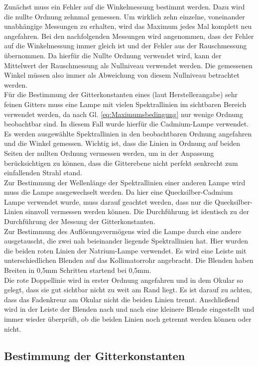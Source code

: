 \documentclass[12pt,a4paper]{article}
\begin{document}
Zunächst muss ein Fehler auf die Winkelmessung bestimmt werden. Dazu wird die nullte Ordnung zehnmal gemessen. Um wirklich zehn einzelne, voneinander unabhängige Messungen zu erhalten, wird das Maximum jedes Mal komplett neu angefahren. Bei den nachfolgenden Messungen wird angenommen, dass der Fehler auf die Winkelmessung immer gleich ist und der Fehler aus der Rauschmessung übernommen. Da hierfür die Nullte Ordnung verwendet wird, kann der Mittelwert der Rauschmessung als Nullniveau verwendet werden. Die gemessenen Winkel müssen also immer als Abweichung von diesem Nullniveau betrachtet werden.\\
Für die Bestimmung der Gitterkonstanten eines (laut Herstellerangabe) sehr feinen Gitters muss eine Lampe mit vielen Spektrallinien im sichtbaren Bereich verwendet werden, da nach Gl. \ref{eq:Maximumsbedingung} nur wenige Ordnung beobachtbar sind. In diesem Fall wurde hierfür die Cadmium-Lampe verwendet. Es werden ausgewählte Spektrallinien in den beobachtbaren Ordnung angefahren und die Winkel gemessen. Wichtig ist, dass die Linien in Ordnung auf beiden Seiten der nullten Ordnung vermessen werden, um in der Anpassung berücksichtigen zu können, dass die Gitterebene nicht perfekt senkrecht zum einfallenden Strahl stand.\\
Zur Bestimmung der Wellenlänge der Spektrallinien einer anderen Lampe wird muss die Lampe ausgewechselt werden. Da hier eine Quecksilber-Cadmium Lampe verwendet wurde, muss darauf geachtet werden, dass nur die Quecksilber-Linien sinnvoll vermessen werden können. Die Durchführung ist identisch zu der Durchführung der Messung der Gitterkonstanten.\\
Zur Bestimmung des Auflösungsvermögens wird die Lampe durch eine andere ausgetauscht, die zwei nah beieinander liegende Spektrallinien hat. Hier wurden die beiden roten Linien der Natrium-Lampe verwendet. Es wird eine Leiste mit unterschiedlichen Blenden auf das Kollimatorrohr angebracht. Die Blenden haben Breiten in 0,5mm Schritten startend bei 0,5mm.\\
Die rote Doppellinie wird in erster Ordnung angefahren und in dem Okular so gelegt, dass sie gut sichtbar nicht zu weit am Rand liegt. Es ist darauf zu achten, dass das Fadenkreuz am Okular nicht die beiden Linien trennt. Anschließend wird in der Leiste der Blenden nach und nach eine kleinere Blende eingestellt und immer wieder überprüft, ob die beiden Linien noch getrennt werden können oder nicht.

\subsection{Bestimmung der Gitterkonstanten}
\end{document}
